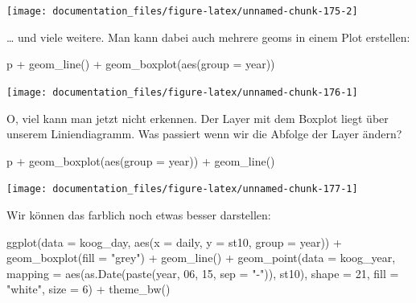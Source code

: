 \documentclass[
]{article}
\newenvironment{Shaded}{\begin{snugshade}}{\end{snugshade}}
\newcommand{\AttributeTok}[1]{\textcolor[rgb]{0.77,0.63,0.00}{#1}}
\newcommand{\DecValTok}[1]{\textcolor[rgb]{0.00,0.00,0.81}{#1}}
\newcommand{\FunctionTok}[1]{\textcolor[rgb]{0.00,0.00,0.00}{#1}}
\newcommand{\NormalTok}[1]{#1}
\newcommand{\SpecialCharTok}[1]{\textcolor[rgb]{0.00,0.00,0.00}{#1}}
\newcommand{\StringTok}[1]{\textcolor[rgb]{0.31,0.60,0.02}{#1}}
\begin{document}
\begin{center}\texttt{[image: documentation\_files/figure-latex/unnamed-chunk-175-2]} \end{center}

\ldots{} und viele weitere. Man kann dabei auch mehrere geoms in einem Plot erstellen:

\begin{Shaded}
\begin{Highlighting}[]
\NormalTok{p }\SpecialCharTok{+} \FunctionTok{geom\_line}\NormalTok{() }\SpecialCharTok{+} \FunctionTok{geom\_boxplot}\NormalTok{(}\FunctionTok{aes}\NormalTok{(}\AttributeTok{group =}\NormalTok{ year))}
\end{Highlighting}
\end{Shaded}

\begin{center}\texttt{[image: documentation\_files/figure-latex/unnamed-chunk-176-1]} \end{center}

O, viel kann man jetzt nicht erkennen. Der Layer mit dem Boxplot liegt über unserem Liniendiagramm. Was passiert wenn wir die Abfolge der Layer ändern?

\begin{Shaded}
\begin{Highlighting}[]
\NormalTok{p }\SpecialCharTok{+} \FunctionTok{geom\_boxplot}\NormalTok{(}\FunctionTok{aes}\NormalTok{(}\AttributeTok{group =}\NormalTok{ year)) }\SpecialCharTok{+} \FunctionTok{geom\_line}\NormalTok{()}
\end{Highlighting}
\end{Shaded}

\begin{center}\texttt{[image: documentation\_files/figure-latex/unnamed-chunk-177-1]} \end{center}

Wir können das farblich noch etwas besser darstellen:

\begin{Shaded}
\begin{Highlighting}[]
\FunctionTok{ggplot}\NormalTok{(}\AttributeTok{data =}\NormalTok{ koog\_day, }\FunctionTok{aes}\NormalTok{(}\AttributeTok{x =}\NormalTok{ daily, }\AttributeTok{y =}\NormalTok{ st10, }\AttributeTok{group =}\NormalTok{ year)) }\SpecialCharTok{+}
  \FunctionTok{geom\_boxplot}\NormalTok{(}\AttributeTok{fill =} \StringTok{"grey"}\NormalTok{) }\SpecialCharTok{+}
  \FunctionTok{geom\_line}\NormalTok{() }\SpecialCharTok{+}
    \FunctionTok{geom\_point}\NormalTok{(}\AttributeTok{data =}\NormalTok{ koog\_year, }\AttributeTok{mapping =} \FunctionTok{aes}\NormalTok{(}\FunctionTok{as.Date}\NormalTok{(}\FunctionTok{paste}\NormalTok{(year, }\DecValTok{06}\NormalTok{, }\DecValTok{15}\NormalTok{, }\AttributeTok{sep =} \StringTok{"{-}"}\NormalTok{)), st10), }\AttributeTok{shape =} \DecValTok{21}\NormalTok{, }\AttributeTok{fill =} \StringTok{"white"}\NormalTok{, }\AttributeTok{size =} \DecValTok{6}\NormalTok{) }\SpecialCharTok{+}
  \FunctionTok{theme\_bw}\NormalTok{()}
\end{Highlighting}
\end{Shaded}
\end{document}
